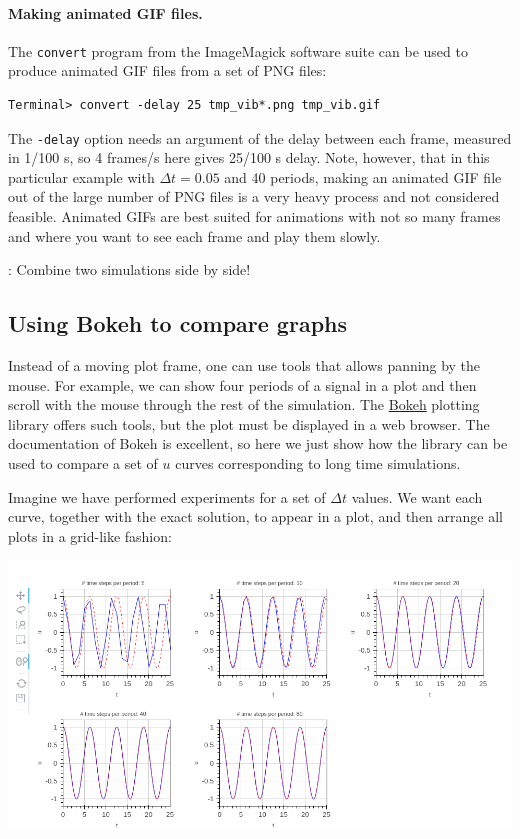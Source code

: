 \documentclass[%
oneside,                 %
final,                   %
10pt]{article}
\newcommand{\shortinlinecomment}[3]{{\color{red}{\bf #1}: #2}}
\begin{document}
\paragraph{Making animated GIF files.}
The \texttt{convert} program from the ImageMagick software suite can be
used to produce animated GIF files from a set of PNG files:

\begin{Verbatim}[frame=lines,label=\fbox{{\tiny Terminal}},framesep=2.5mm,framerule=0.7pt,fontsize=\fontsize{9pt}{9pt}]
Terminal> convert -delay 25 tmp_vib*.png tmp_vib.gif
\end{Verbatim}
The \texttt{-delay} option needs an argument of the delay between each frame,
measured in 1/100 s, so 4 frames/s here gives 25/100 s delay.
Note, however, that in this particular example
with $\Delta t=0.05$ and 40 periods,
making an animated GIF file out of
the large number of PNG files is a very heavy process and not
considered feasible. Animated GIFs are best suited for animations with
not so many frames and where you want to see each frame and play them
slowly.

\shortinlinecomment{hpl 5}{ Combine two simulations side by side! }{ Combine two simulations side }

\subsection{Using Bokeh to compare graphs}

Instead of a moving plot frame, one can use tools that allows panning
by the mouse. For example, we can show four periods of a signal in
a plot and then scroll with the mouse through the rest of the
simulation. The \href{{http://bokeh.pydata.org/en/latest/docs/quickstart.html}}{Bokeh} plotting library offers such tools, but the plot must be displayed in
a web browser. The documentation of Bokeh is excellent, so here we just
show how the library can be used to compare a set of $u$ curves corresponding
to long time simulations.

Imagine we have performed experiments for a set of $\Delta t$ values.
We want each curve, together with the exact solution, to appear in
a plot, and then arrange all plots in a grid-like fashion:



\centerline{\includegraphics[width=1.0\linewidth]{fig-vib/bokeh_gridplot1.png}}
\end{document}
